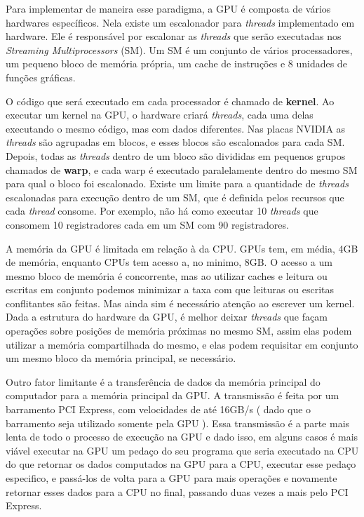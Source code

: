     Para implementar de maneira esse paradigma, a GPU é composta de vários hardwares específicos. Nela existe um 
escalonador para \textit{threads} implementado em hardware. Ele é responsável por escalonar as \textit{threads} que serão
executadas nos \textit{Streaming Multiprocessors} (SM). Um SM é um conjunto de vários processadores, um pequeno bloco de
memória própria, um cache de instruções e 8 unidades de funções gráficas.

    O código que será executado em cada processador é chamado de \textbf{kernel}. Ao executar um kernel na GPU, o 
hardware criará \textit{threads}, cada uma delas executando o mesmo código, mas com dados diferentes. Nas placas NVIDIA as \textit{threads} 
são agrupadas em blocos, e esses blocos são escalonados para cada SM. Depois, todas as \textit{threads} dentro de um bloco são 
divididas em pequenos grupos chamados de \textbf{warp}, e cada warp é executado paralelamente dentro do 
mesmo SM para qual o bloco foi escalonado. Existe um limite para a quantidade de \textit{threads} escalonadas para execução
dentro de um SM, que é definida pelos recursos que cada \textit{thread} consome. Por exemplo, não há como executar 10 \textit{threads}
que consomem 10 registradores cada em um SM com 90 registradores.

    A memória da GPU é limitada em relação à da CPU. GPUs tem, em média, 4GB
de memória, enquanto CPUs tem acesso a, no minimo, 8GB. O acesso a um mesmo bloco de memória é concorrente, mas ao utilizar caches e leitura 
ou escritas em conjunto podemos minimizar a taxa com que leituras ou escritas conflitantes são feitas. Mas ainda sim é 
necessário atenção ao escrever um kernel. Dada a estrutura do hardware da GPU, é melhor deixar \textit{threads} que façam 
operações sobre posições de memória próximas no mesmo SM, assim elas podem utilizar a memória compartilhada do mesmo, e 
elas podem requisitar em conjunto um mesmo bloco da memória principal, se necessário.

    Outro fator limitante é a transferência de dados da memória principal do computador para a memória 
principal da GPU. A transmissão é feita por um barramento PCI Express, com velocidades de até 16GB/s ( dado que o
barramento seja utilizado somente pela GPU ). Essa transmissão é a parte mais lenta de todo o
processo de execução na GPU e dado isso, em alguns casos é mais viável executar na GPU um pedaço do seu programa que 
seria executado na CPU do que retornar os dados computados na GPU para a CPU, executar esse pedaço especifico, e 
passá-los de volta para a GPU para mais operações e novamente retornar esses dados para a CPU no final, passando duas 
vezes a mais pelo PCI Express.

